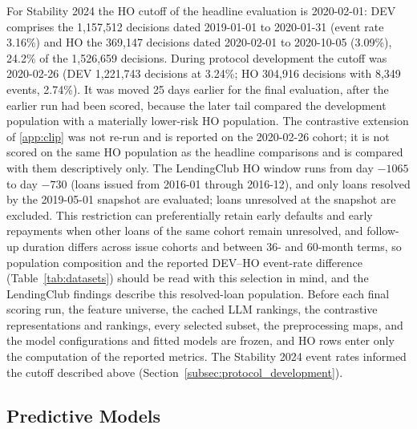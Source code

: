 \documentclass[final,5p,twocolumn]{elsarticle}
\begin{document}
For Stability 2024 the HO cutoff of the headline evaluation is 2020-02-01: DEV comprises the 1,157,512 decisions dated 2019-01-01 to 2020-01-31 (event rate 3.16\%) and HO the 369,147 decisions dated 2020-02-01 to 2020-10-05 (3.09\%), 24.2\% of the 1,526,659 decisions. During protocol development the cutoff was 2020-02-26 (DEV 1,221,743 decisions at 3.24\%; HO 304,916 decisions with 8,349 events, 2.74\%). It was moved 25 days earlier for the final evaluation, after the earlier run had been scored, because the later tail compared the development population with a materially lower-risk HO population. The contrastive extension of \ref{app:clip} was not re-run and is reported on the 2020-02-26 cohort; it is not scored on the same HO population as the headline comparisons and is compared with them descriptively only. The LendingClub HO window runs from day $-1065$ to day $-730$ (loans issued from 2016-01 through 2016-12), and only loans resolved by the 2019-05-01 snapshot are evaluated; loans unresolved at the snapshot are excluded. This restriction can preferentially retain early defaults and early repayments when other loans of the same cohort remain unresolved, and follow-up duration differs across issue cohorts and between 36- and 60-month terms, so population composition and the reported DEV--HO event-rate difference (Table~\ref{tab:datasets}) should be read with this selection in mind, and the LendingClub findings describe this resolved-loan population. Before each final scoring run, the feature universe, the cached LLM rankings, the contrastive representations and rankings, every selected subset, the preprocessing maps, and the model configurations and fitted models are frozen, and HO rows enter only the computation of the reported metrics. The Stability 2024 event rates informed the cutoff described above (Section~\ref{subsec:protocol_development}).

\subsection{Predictive Models}
\label{subsec:models}
\end{document}
